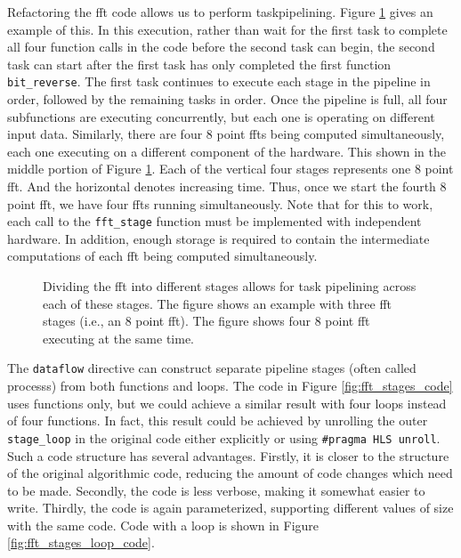 Refactoring the \gls{fft} code allows us to perform \gls{taskpipelining}. Figure \ref{fig:fftstages} gives an example of this. In this execution, rather than wait for the first task to complete all four function calls in the code before the second task can begin, the second task can start after the first task has only completed the first function \lstinline{bit_reverse}. The first task continues to execute each stage in the pipeline in order, followed by the remaining tasks in order.  Once the pipeline is full, all four subfunctions are executing concurrently, but each one is operating on different input data. Similarly, there are four 8 point \glspl{fft} being computed simultaneously, each one executing on a different component of the hardware. This shown in the middle portion of Figure \ref{fig:fftstages}. Each of the vertical four stages represents one 8 point \gls{fft}. And the horizontal denotes increasing time. Thus, once we start the fourth 8 point \gls{fft}, we have four \glspl{fft} running simultaneously.  Note that for this to work, each call to the \lstinline{fft_stage} function must be implemented with independent hardware.  In addition, enough storage is required to contain the intermediate computations of each \gls{fft} being computed simultaneously.

\begin{figure}
\centering
{\scriptsize }

\caption{ Dividing the \gls{fft} into different stages allows for task pipelining across each of these stages. The figure shows an example with three \gls{fft} stages (i.e., an 8 point \gls{fft}). The figure shows four 8 point \gls{fft} executing at the same time. }
\label{fig:fftstages}
\end{figure}

The \lstinline|dataflow| directive can construct separate pipeline stages (often called \glspl{process}) from both functions and loops. The code in Figure \ref{fig:fft_stages_code} uses functions only, but we could achieve a similar result with four loops instead of four functions.  In fact, this result could be achieved by unrolling the outer \lstinline|stage_loop| in the original code either explicitly or using \lstinline|#pragma HLS unroll|.  Such a code structure has several advantages.  Firstly, it is closer to the structure of the original algorithmic code, reducing the amount of code changes which need to be made.   Secondly, the code is less verbose, making it somewhat easier to write.  Thirdly, the code is again parameterized, supporting different values of size with the same code.  Code with a loop is shown in Figure \ref{fig:fft_stages_loop_code}.

